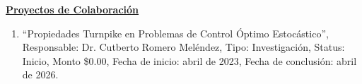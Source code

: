 {\large \textbf{\underline{Proyectos de Colaboración}}}

\begin{enumerate}
\item “Propiedades Turnpike en Problemas de Control Óptimo Estocástico”, Responsable: Dr. 
Cutberto Romero Meléndez, 
Tipo: Investigación, Status: Inicio, Monto \$0.00, Fecha de inicio: abril de 2023, 
Fecha de conclusión: abril de 2026.
\end{enumerate}

